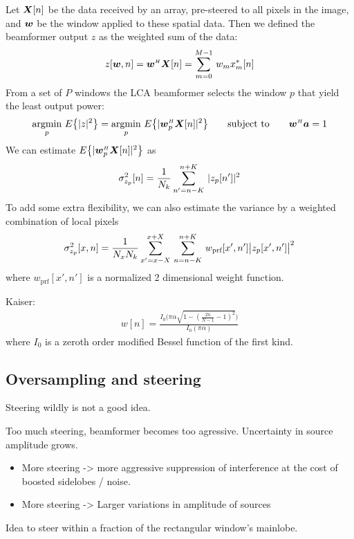 Let $\boldsymbol{X}[n]$ be the data received by an array, pre-steered to all pixels in the image, and $\boldsymbol{w}$ be the window applied to these spatial data. Then we defined the beamformer output $z$ as the weighted sum of the data:
%
\begin{align}
z[\boldsymbol{w},n] = \boldsymbol{w}^{\scriptscriptstyle H}\boldsymbol{X}[n] = \sum\limits_{m=0}^{M-1}\, w_m x_m^*[n]
\end{align}
%
From a set of $P$ windows the LCA beamformer selects the window $p$ that yield the least output power:
%
\begin{align}
\underset{p}{\text{argmin}}\ {E\big\{|z|^2\big\}} = \underset{p}{\text{argmin}}\ {E\big\{|\boldsymbol{w}_p^{\scriptscriptstyle H}\boldsymbol{X}[n]|^2\big\}} \qquad\text{subject to}\qquad \boldsymbol{w}^{\scriptscriptstyle H}\boldsymbol{a} = 1
\end{align}
%
We can estimate $E\big\{|\boldsymbol{w}_p^{\scriptscriptstyle H}\boldsymbol{X}[n]|^2\big\}$ as
%
\begin{align*}
\sigma^2_{z_p}[n] = \frac{1}{N_k} \sum\limits_{n'=n-K}^{n+K}\, | z_p[n'] |^2
\end{align*}
%
To add some extra flexibility, we can also estimate the variance by a weighted combination of local pixels
%
\begin{align*}
\sigma^2_{z_p}[x,n] = \frac{1}{N_x N_k} \sum\limits_{x'=x-X}^{x+X}\, \sum\limits_{n=n-K}^{n+K}\, w_\text{prf}[x',n']\big| z_p[x',n'] \big|^2
\end{align*}
%
where $w_\text{prf}[x',n']$ is a normalized 2 dimensional weight function. 

Kaiser:
%
\begin{align*}
w[n] = \frac{I_0\big( \pi\alpha\sqrt{1-(\frac{2n}{N-1}-1)^2}\big)}{I_0(\pi\alpha)}
\end{align*}
%
where $I_0$ is a zeroth order modified Bessel function of the first kind.

\subsection{Oversampling and steering}

Steering wildly is not a good idea.

Too much steering, beamformer becomes too agressive. Uncertainty in source amplitude grows.

\begin{itemize}
\item More steering -> more aggressive suppression of interference at the cost of boosted sidelobes / noise.
\item More steering -> Larger variations in amplitude of sources
\end{itemize}

Idea to steer within a fraction of the rectangular window's mainlobe. 


